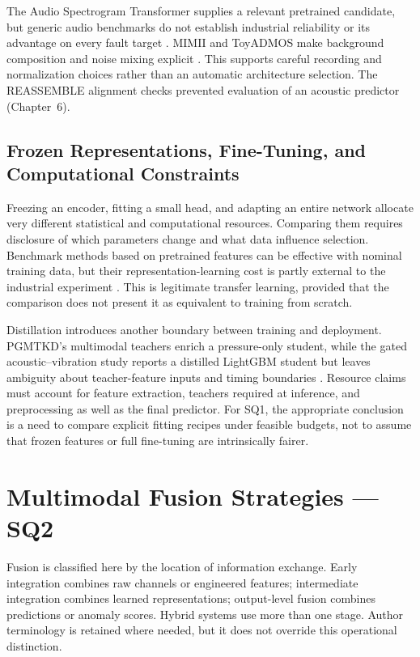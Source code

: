 The Audio Spectrogram Transformer supplies a relevant pretrained candidate, but generic audio benchmarks do not establish industrial reliability or its advantage on every fault target \citep{P011}. MIMII and ToyADMOS make background composition and noise mixing explicit \citep{Purohit2019MIMII,Koizumi2019ToyADMOS}. This supports careful recording and normalization choices rather than an automatic architecture selection. The REASSEMBLE alignment checks prevented evaluation of an acoustic predictor (Chapter~6).

\subsection{Frozen Representations, Fine-Tuning, and Computational Constraints}

Freezing an encoder, fitting a small head, and adapting an entire network allocate very different statistical and computational resources. Comparing them requires disclosure of which parameters change and what data influence selection. Benchmark methods based on pretrained features can be effective with nominal training data, but their representation-learning cost is partly external to the industrial experiment \citep{Roth2022Towards,Costanzino2024Multimodal}. This is legitimate transfer learning, provided that the comparison does not present it as equivalent to training from scratch.

Distillation introduces another boundary between training and deployment. PGMTKD's multimodal teachers enrich a pressure-only student, while the gated acoustic--vibration study reports a distilled LightGBM student but leaves ambiguity about teacher-feature inputs and timing boundaries \citep{Li2025PGMTKD,Huang2026Rolling}. Resource claims must account for feature extraction, teachers required at inference, and preprocessing as well as the final predictor. For SQ1, the appropriate conclusion is a need to compare explicit fitting recipes under feasible budgets, not to assume that frozen features or full fine-tuning are intrinsically fairer.

\section{Multimodal Fusion Strategies --- SQ2}

Fusion is classified here by the location of information exchange. Early integration combines raw channels or engineered features; intermediate integration combines learned representations; output-level fusion combines predictions or anomaly scores. Hybrid systems use more than one stage. Author terminology is retained where needed, but it does not override this operational distinction.

